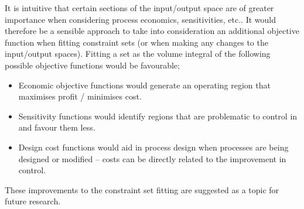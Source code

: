 It is intuitive that certain sections of the input/output space are of greater importance when considering process economics, sensitivities, etc..
It would therefore be a sensible approach to take into consideration an additional objective function when fitting constraint sets (or when making any changes to the input/output spaces).
Fitting a set as the volume integral of the following possible objective functions would be favourable;
\begin{itemize}
\item Economic objective functions would generate an operating region that maximises profit / minimises cost.
\item Sensitivity functions would identify regions that are problematic to control in and favour them less.
\item Design cost functions would aid in process design when processes are being designed or modified -- costs can be directly related to the improvement in control.
\end{itemize}
These improvements to the constraint set fitting are suggested as a topic for future research.

